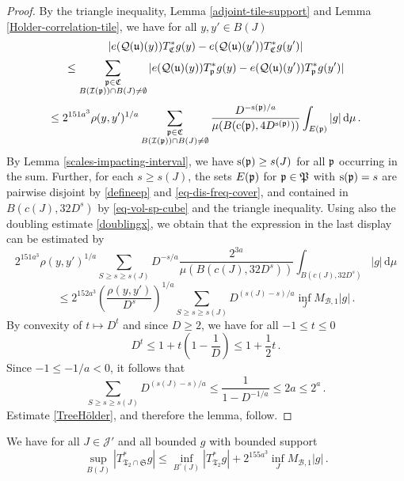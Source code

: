 {\begin{proof}
        By the triangle inequality, Lemma \ref{adjoint-tile-support} and Lemma \ref{Holder-correlation-tile}, we have for all $y, y' \in B(J)$
        \begin{equation}
            \label{eq-C-Lip}
            |e({\mathcal{Q}}({\mathfrak u})(y)) T_{{\mathfrak C}}^* g(y) - e({\mathcal{Q}}({\mathfrak u})(y')) T_{{\mathfrak C}}^* g(y')|
        \end{equation}
        $$
            \leq \sum_{\substack{{\mathfrak p} \in {\mathfrak C}\\ B({\mathcal{I}}({\mathfrak p})) \cap B(J) \neq \emptyset}} |e({\mathcal{Q}}({\mathfrak u})(y)) T_{{\mathfrak p}}^* g(y) - e({\mathcal{Q}}({\mathfrak u})(y')) T_{{\mathfrak p}}^* g(y')|
        $$
        $$
            \le 2^{151a^3}\rho(y,y')^{1/a}  \sum_{\substack{{\mathfrak p} \in {\mathfrak C}\\ B({\mathcal{I}}({\mathfrak p})) \cap B(J) \neq \emptyset}} \frac{D^{- {\mathrm{s}}({\mathfrak p})/a}}{\mu(B({\mathrm{c}}({\mathfrak p}), 4D^{{\mathrm{s}}({\mathfrak p})}))} \int_{E({\mathfrak p})} |g| \, \mathrm{d}\mu\,.
        $$
        By Lemma \ref{scales-impacting-interval}, we have ${\mathrm{s}}({\mathfrak p}) \ge s(J)$ for all ${\mathfrak p}$ occurring in the sum. Further, for each $s \ge s(J)$, the sets $E({\mathfrak p})$ for ${\mathfrak p} \in {\mathfrak P}$ with ${\mathrm{s}}({\mathfrak p}) = s$ are pairwise disjoint by \eqref{defineep} and \eqref{eq-dis-freq-cover}, and contained in $B(c(J), 32D^{s})$ by \eqref{eq-vol-sp-cube} and the triangle inequality. Using also the doubling estimate \eqref{doublingx}, we obtain that the expression in the last display can be estimated by
        $$
            2^{151a^3}\rho(y,y')^{1/a} \sum_{S \ge s \ge s(J)}  D^{-s/a}  \frac{2^{3a}}{\mu(B(c(J), 32D^{s}))} \int_{B(c(J), 32D^{s})} |g| \, \mathrm{d}\mu
        $$
        $$
            \le 2^{152a^3} \left(\frac{\rho(y,y')}{D^s}\right)^{1/a} \sum_{S \ge s \ge s(J)} D^{(s(J) - s)/a} \inf_J M_{\mathcal{B},1} |g|\,.
        $$
        By convexity of $t \mapsto D^t$ and since $D \ge 2$, we have for all $-1 \le t \le 0$
        $$
            D^t \le 1 + t(1 - \frac{1}{D}) \le 1 + \frac{1}{2}t\,.
        $$
        Since $-1 \le -1/a <0$, it follows that
        $$
            \sum_{S \ge s \ge s(J)} D^{(s(J) - s)/a} \le \frac{1}{1 - D^{-1/a}} \le 2a \le 2^a\,.
        $$
        Estimate \eqref{TreeHölder}, and therefore the lemma, follow.
    \end{proof}

    \begin{lemma}
        \label{global-tree-control-2}
        We have for all $J \in \mathcal{J}'$ and all bounded $g$ with bounded support
        $$
            \sup_{B(J)} |T^*_{\mathfrak{T}_2 \cap \mathfrak{S}} g| \le \inf_{B^\circ{}(J)} |T^*_{\mathfrak{T}_2} g| + 2^{155a^3} \inf_{J} M_{\mathcal{B},1}|g|\,.
        $$
    \end{lemma}

}

